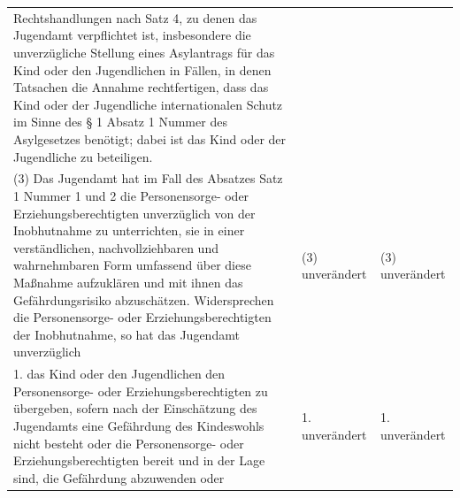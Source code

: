 \documentclass[10pt,a4paper,landscape]{article}
\begin{document}
\begin{longtable}{|L{8.2cm}|L{8.2cm}|L{8.2cm}|}
Rechtshandlungen nach Satz 4, zu  \newline denen das Jugendamt verpflichtet ist,  insbesondere die unverzügliche Stellung  \newline eines Asylantrags für das Kind oder den  \newline Jugendlichen in Fällen, in denen Tatsachen  \newline die Annahme rechtfertigen, dass das Kind  \newline oder der Jugendliche internationalen  \newline Schutz im Sinne des \S{} 1 Absatz 1 Nummer   des Asylgesetzes benötigt; dabei ist das  \newline Kind oder der Jugendliche zu beteiligen. \\
\hhline{|---|}
(3) Das Jugendamt hat im Fall des Absatzes   Satz 1 Nummer 1 und 2 die  \newline Personensorge- oder  \newline Erziehungsberechtigten unverzüglich von  \newline der Inobhutnahme zu unterrichten, sie in  \newline einer verständlichen, nachvollziehbaren und  \newline wahrnehmbaren Form umfassend über  \newline diese Maßnahme aufzuklären und mit ihnen  \newline das Gefährdungsrisiko abzuschätzen.  \newline Widersprechen die Personensorge- oder  \newline Erziehungsberechtigten der Inobhutnahme,  \newline so hat das Jugendamt unverzüglich & (3) unverändert & (3) unverändert \\
\hhline{|---|}
1.  \newline das Kind oder den Jugendlichen den  \newline Personensorge- oder  \newline Erziehungsberechtigten zu übergeben,  \newline sofern nach der Einschätzung des  \newline Jugendamts eine Gefährdung des  \newline Kindeswohls nicht besteht oder die  \newline Personensorge- oder  \newline Erziehungsberechtigten bereit und in der  \newline Lage sind, die Gefährdung abzuwenden  \newline oder & 1. unverändert & 1. unverändert \\

\end{longtable}
\end{document}
